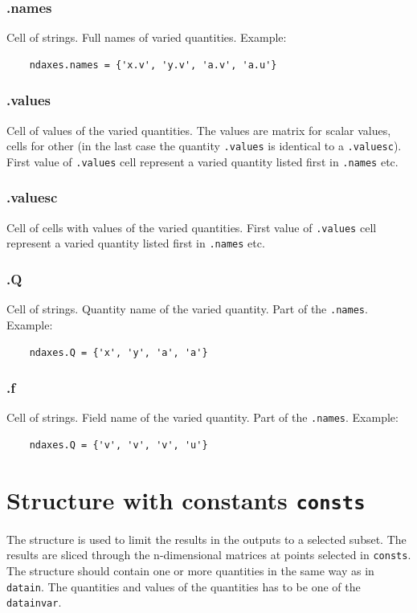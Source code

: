 \documentclass[12pt,a4paper,oneside]{report} %
\newcommand{\li}[1]{\lstinline{#1}}     %
\begin{document}
\subsubsection{\textsf{.names}}
Cell of strings. Full names of varied quantities. Example:
\begin{lstlisting}
    ndaxes.names = {'x.v', 'y.v', 'a.v', 'a.u'}
\end{lstlisting}

\subsubsection{\textsf{.values}}
Cell of values of the varied quantities. The values are matrix for scalar
values, cells for other (in the last case the quantity \li{.values} is
identical to a \li{.valuesc}). First value of \li{.values} cell represent a
varied quantity listed first in \li{.names} etc.

\subsubsection{\textsf{.valuesc}}
Cell of cells with values of the varied quantities. First value of \li{.values}
cell represent a varied quantity listed first in \li{.names} etc.

\subsubsection{\textsf{.Q}}
Cell of strings. Quantity name of the varied quantity. Part of the \li{.names}. Example:
\begin{lstlisting}
    ndaxes.Q = {'x', 'y', 'a', 'a'}
\end{lstlisting}

\subsubsection{\textsf{.f}}
Cell of strings. Field name of the varied quantity. Part of the \li{.names}. Example:
\begin{lstlisting}
    ndaxes.Q = {'v', 'v', 'v', 'u'}
\end{lstlisting}

\section{Structure with constants \tt consts}
\label{S:QWTBvar:consts}
The structure is used to limit the results in the outputs to a selected subset.
The results are sliced through the n-dimensional matrices at points selected in
\li{consts}. The structure should contain one or more quantities in the same
way as in \li{datain}. The quantities and values of the quantities has to be
one of the \li{datainvar}.
\end{document}
